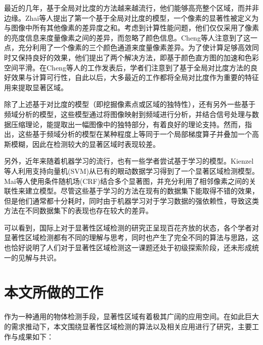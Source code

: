 最近的几年，基于全局对比度的方法越来越流行，他们能够高亮整个区域，而并非边缘。Zhai等人\cite{zhai2006visual}提出了第一个基于全局对比度的模型，一个像素的显著性被定义为与图像中所有其他像素的差异度之和。考虑到计算性能问题，他们仅仅采用了像素的亮度信息来度量像素之间的差异，而忽略了颜色信息。Cheng等人\cite{cheng2011global}注意到了这一点，充分利用了一个像素的三个颜色通道来度量像素差异。为了使计算足够高效同时又保持良好的效果，他们提出了两个解决方法，即基于颜色直方图的加速和色彩空间平滑。在Cheng等人的工作发表后，学者们注意到了基于全局对比度方法的良好效果与计算可行性，自此以后，大多最近的工作都将全局对比度作为重要的特征用来提取显著区域。

除了上述基于对比度的模型（即挖掘像素点或区域的独特性），还有另外一些基于频域分析的模型\cite{achanta2009frequency}\cite{hou2007saliency}\cite{hou2012image}，这些模型通过将图像映射到频域进行分析，并结合信号处理与数据压缩理论，能提取出一幅图像中的独特部分，有着良好的理论支持。然而，\cite{hou2012image}指出，这些基于频域分析的模型在某种程度上等同于一个局部梯度算子并叠加一个高斯模糊，因此在检测较大的显著区域时表现较差。

另外，近年来随着机器学习的流行，也有一些学者尝试基于学习的模型。Kienzel等人\cite{kienzle2007nonparametric}利用支持向量机(SVM)从已有的眼动数据学习得到了一个显著区域检测模型。Mai等人\cite{maisaliency}使用条件随机场(CRF)结合多个显著图，并充分利用了相邻像素之间的关联性来建立模型。尽管这些基于学习的方法在现有的数据集下能取得不错的效果，但是他们通常都十分耗时，同时由于机器学习对于学习数据的强依赖性，导致这类方法在不同数据集下的表现也存在较大的差异。

可以看到，国际上对于显著性区域检测的研究正呈现百花齐放的状态，各个学者对显著性区域检测都有不同的理解与思考，同时也产生了完全不同的算法与思路，这也恰好说明了人们对于显著性区域检测这一课题还处于初级探索阶段，还未形成统一的见解与共识。

\section{本文所做的工作}
作为一种通用的物体检测手段，显著性区域有着极其广阔的应用空间\cite{tsai2012hierarchical}\cite{fang2012effective}\cite{deigmoeller2010context}\cite{jiang2011automatic}。在如此巨大的需求推动下，本文围绕显著性区域检测的算法以及相关应用进行了研究，主要工作与成果如下：

